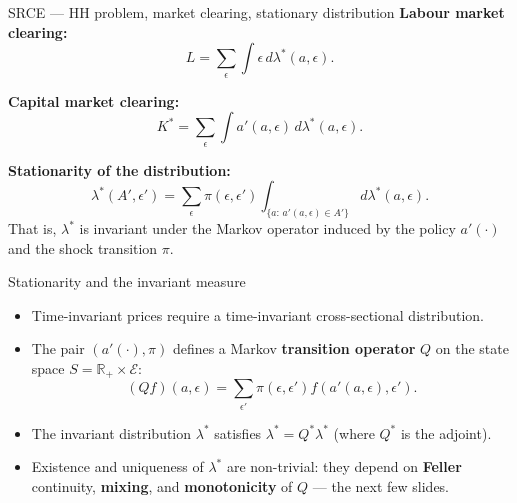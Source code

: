 \documentclass[10pt,english,aspectratio=169]{beamer}
\begin{document}
\begin{frame}{SRCE --- HH problem, market clearing, stationary distribution}
\textbf{Labour market clearing:}
\[
L = \sum_{\epsilon} \int \epsilon \, d\lambda^*(a,\epsilon).
\]

\textbf{Capital market clearing:}
\[
K^* = \sum_{\epsilon} \int a'(a,\epsilon) \, d\lambda^*(a,\epsilon).
\]

\textbf{Stationarity of the distribution:}
\[
\lambda^*(A',\epsilon') = \sum_{\epsilon} \pi(\epsilon,\epsilon') \int_{\{a:\,a'(a,\epsilon)\in A'\}} d\lambda^*(a,\epsilon).
\]
\medskip
That is, $\lambda^*$ is invariant under the Markov operator induced by the policy $a'(\cdot)$ and the shock transition $\pi$.
\end{frame}

\begin{frame}{Stationarity and the invariant measure}
\begin{itemize}
\item Time-invariant prices require a time-invariant cross-sectional distribution.
\medskip
\item The pair $(a'(\cdot), \pi)$ defines a Markov \textbf{transition operator} $Q$ on the state space $S = \mathbb{R}_+ \times \mathcal{E}$:
\[
(Qf)(a,\epsilon) = \sum_{\epsilon'} \pi(\epsilon,\epsilon') f(a'(a,\epsilon),\epsilon').
\]
\medskip
\item The invariant distribution $\lambda^*$ satisfies $\lambda^* = Q^* \lambda^*$ (where $Q^*$ is the adjoint).
\medskip
\item Existence and uniqueness of $\lambda^*$ are non-trivial: they depend on \textbf{Feller} continuity, \textbf{mixing}, and \textbf{monotonicity} of $Q$ --- the next few slides.
\end{itemize}
\end{frame}
\end{document}
